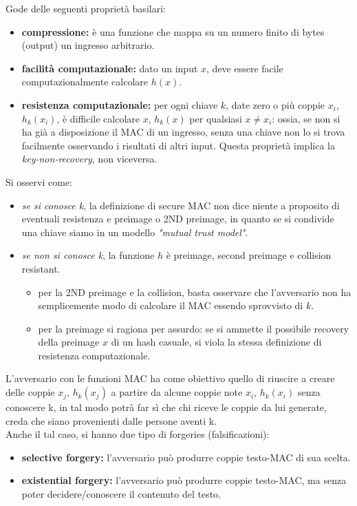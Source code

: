 \documentclass[a4paper,12pt]{article}
\begin{document}
Gode delle seguenti proprietà basilari:
\begin{itemize}
	\item \textbf{compressione:} è una funzione che mappa su un numero finito di bytes (output) un ingresso arbitrario.
	\item \textbf{facilità computazionale:} dato un input $x$, deve essere facile computazionalmente calcolare $h(x)$.
	\item \textbf{resistenza computazionale:} per ogni chiave $k$, date zero o più coppie $x_i$, $h_k(x_i)$, è difficile calcolare $x$, $h_k(x)$ per qualsiasi $x \neq x_i$: ossia, se non si ha già a disposizione il MAC di un ingresso, senza una chiave non lo si trova facilmente osservando i risultati di altri input. Questa proprietà implica la \textit{key-non-recovery}, non viceversa.
\end{itemize}
Si osservi come:
\begin{itemize}
	\item \textit{se si conosce k}, la definizione di secure MAC non dice niente a proposito di eventuali resistenza e preimage o 2ND preimage, in quanto se si condivide una chiave siamo in un modello \textit{"mutual trust model"}.
	\item \textit{se non si conosce k}, la funzione $h$ è preimage, second preimage e collision resistant.
	\begin{itemize}
		\item per la 2ND preimage e la collision, basta osservare che l'avversario non ha semplicemente modo di calcolare il MAC essendo sprovvisto di $k$.
		\item per la preimage si ragiona per assurdo: se si ammette il possibile recovery della preimage $x$ di un hash casuale, si viola la stessa definizione di resistenza computazionale.
	\end{itemize}
\end{itemize}
L'avversario con le funzioni MAC ha come obiettivo quello di riuscire a creare delle coppie $x_j$, $h_k(x_j)$ a partire da alcune coppie note $x_i$, $h_k(x_i)$ senza conoscere k, in tal modo potrà far sì che chi riceve le coppie da lui generate, creda che siano provenienti dalle persone aventi k. \\
Anche il tal caso, si hanno due tipo di forgeries (falsificazioni):
\begin{itemize}
	\item \textbf{selective forgery:} l'avversario può produrre coppie testo-MAC di sua scelta.
	\item \textbf{existential forgery:} l'avversario può produrre coppie testo-MAC, ma senza poter decidere/conoscere il contenuto del testo.
\end{itemize}
\end{document}
